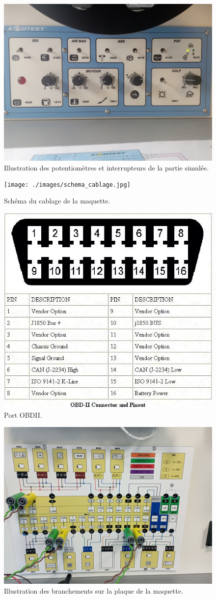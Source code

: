 \documentclass{rapportECC}
\begin{document}
\begin{figure}[H]
    \centering
    \includegraphics[width=.7\textwidth]{./images/potentiometres_simu.jpg}
    \caption{Illustration des potentiomètres et interrupteurs de la partie simulée.}
    \label{fig:potentiometres}
\end{figure}

\begin{figure}[H]
    \centering
    \texttt{[image: ./images/schema\_cablage.jpg]}
    \caption{Schéma du cablage de la maquette.}
    \label{fig:schema_cablage}
\end{figure}

\begin{figure}[H]
    \centering
    \includegraphics[width=.7\textwidth]{./images/OBDII_pins.png}
    \caption{Port OBDII.}
    \label{fig:Port_OBDII}
\end{figure}

\begin{figure}[H]
    \centering
    \includegraphics[width=.6\textwidth]{./images/tableau_interface.jpg}
    \caption{Illustration des branchements sur la plaque de la maquette.}
    \label{fig:tableau_interface}
\end{figure}
\end{document}
